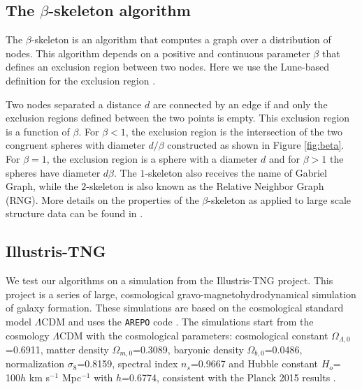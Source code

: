 \documentclass[usenatbib]{mnras}
\begin{document}
\subsection{The $\beta$-skeleton algorithm}


The $\beta$-skeleton is an algorithm that computes a graph over a
distribution of nodes.  
This algorithm depends on a positive and continuous parameter $\beta$
that defines an exclusion region between two nodes.
Here we use the Lune-based definition for the exclusion region \citep{Kirkpatrick1985}.

Two nodes separated a distance $d$ are connected by an edge if and only the exclusion regions defined between the two points is empty.
This exclusion region is a function of $\beta$.
For $\beta<1$, the exclusion region is the intersection of the two  
congruent spheres with diameter $d/\beta$ constructed as shown in Figure \ref{fig:beta}.
For  $\beta=1$, the exclusion region is a sphere with a diameter $d$ and for $\beta>1$ the spheres have diameter $d\beta$.
The $1$-skeleton also receives the name of Gabriel Graph, while the
 $2$-skeleton is also known as the Relative Neighbor Graph (RNG).
More details on the properties of the $\beta$-skeleton as applied to large scale structure data can be found in \cite{Fang2019}.

\subsection{Illustris-TNG}

We test our algorithms on a simulation from the Illustris-TNG project.
This project \citep{Nelson2019} is a series of large,
cosmological gravo-magnetohydrodynamical simulation of galaxy formation. 
These simulations are based on the cosmological standard model
$\Lambda$CDM and uses the \texttt{AREPO} code \citep{Springel2011}.
The simulations start from the cosmology $\Lambda$CDM with the
cosmological parameters: cosmological constant
$\Omega_{\Lambda,0}$=0.6911, matter density $\Omega_{m,0}$=0.3089,
baryonic density $\Omega_{b,0}$=0.0486, normalization
$\sigma_8$=0.8159, spectral index $n_s$=0.9667 and Hubble constant
$H_o$= 100$h$ km s$^{-1}$ Mpc$^{-1}$ with $h$=0.6774, consistent with
the Planck 2015 results \citep{Ade2016}.  
\end{document}
